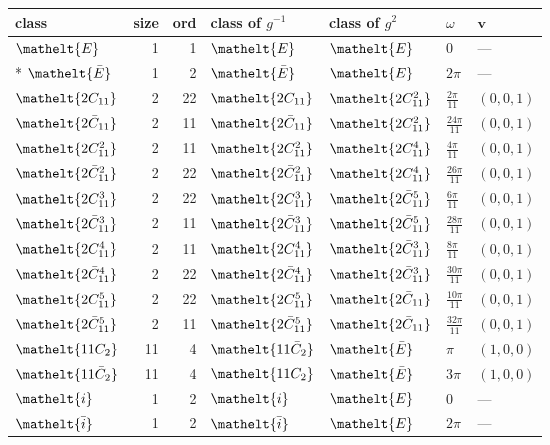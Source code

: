 \documentclass[10pt,a4paper]{article}
\numberwithin{equation}{section}
\newcommand{\eltfont}[1]{{\let\sigma\eltsigma\mathelt{#1}}}
\newcommand{\cls}[1]{\eltfont{#1}}
\newcommand{\dirvec}[3]{(#1, #2, #3)}
\newcommand{\vv}{\mathbf{v}}
\newcommand{\barred}[1]{\bar{#1}}
\begin{document}
{\renewcommand{\arraystretch}{1.3}\begin{longtable}{@{}lrrllll@{}}\toprule
class & size & ord & class of $g^{-1}$ & class of $g^{2}$ & $\omega$ & $\vv$\\\midrule\endhead
\bottomrule\endfoot\endlastfoot
$\cls{E}$ & 1 & 1 & $\cls{E}$ & $\cls{E}$ & $0$ & ---\\*
$\cls{\barred{E}}$ & 1 & 2 & $\cls{\barred{E}}$ & $\cls{E}$ & $2\pi$ & ---\\
$\cls{2C_{11}}$ & 2 & 22 & $\cls{2C_{11}}$ & $\cls{2C_{11}^{2}}$ & $\tfrac{2\pi}{11}$ & $\dirvec{0}{0}{1}$\\
$\cls{2\barred{C}_{11}}$ & 2 & 11 & $\cls{2\barred{C}_{11}}$ & $\cls{2C_{11}^{2}}$ & $\tfrac{24\pi}{11}$ & $\dirvec{0}{0}{1}$\\
$\cls{2C_{11}^{2}}$ & 2 & 11 & $\cls{2C_{11}^{2}}$ & $\cls{2C_{11}^{4}}$ & $\tfrac{4\pi}{11}$ & $\dirvec{0}{0}{1}$\\
$\cls{2\barred{C}_{11}^{2}}$ & 2 & 22 & $\cls{2\barred{C}_{11}^{2}}$ & $\cls{2C_{11}^{4}}$ & $\tfrac{26\pi}{11}$ & $\dirvec{0}{0}{1}$\\
$\cls{2C_{11}^{3}}$ & 2 & 22 & $\cls{2C_{11}^{3}}$ & $\cls{2\barred{C}_{11}^{5}}$ & $\tfrac{6\pi}{11}$ & $\dirvec{0}{0}{1}$\\
$\cls{2\barred{C}_{11}^{3}}$ & 2 & 11 & $\cls{2\barred{C}_{11}^{3}}$ & $\cls{2\barred{C}_{11}^{5}}$ & $\tfrac{28\pi}{11}$ & $\dirvec{0}{0}{1}$\\
$\cls{2C_{11}^{4}}$ & 2 & 11 & $\cls{2C_{11}^{4}}$ & $\cls{2\barred{C}_{11}^{3}}$ & $\tfrac{8\pi}{11}$ & $\dirvec{0}{0}{1}$\\
$\cls{2\barred{C}_{11}^{4}}$ & 2 & 22 & $\cls{2\barred{C}_{11}^{4}}$ & $\cls{2\barred{C}_{11}^{3}}$ & $\tfrac{30\pi}{11}$ & $\dirvec{0}{0}{1}$\\
$\cls{2C_{11}^{5}}$ & 2 & 22 & $\cls{2C_{11}^{5}}$ & $\cls{2\barred{C}_{11}}$ & $\tfrac{10\pi}{11}$ & $\dirvec{0}{0}{1}$\\
$\cls{2\barred{C}_{11}^{5}}$ & 2 & 11 & $\cls{2\barred{C}_{11}^{5}}$ & $\cls{2\barred{C}_{11}}$ & $\tfrac{32\pi}{11}$ & $\dirvec{0}{0}{1}$\\
$\cls{11C_{2}}$ & 11 & 4 & $\cls{11\barred{C}_{2}}$ & $\cls{\barred{E}}$ & $\pi$ & $\dirvec{1}{0}{0}$\\
$\cls{11\barred{C}_{2}}$ & 11 & 4 & $\cls{11C_{2}}$ & $\cls{\barred{E}}$ & $3\pi$ & $\dirvec{1}{0}{0}$\\
$\cls{i}$ & 1 & 2 & $\cls{i}$ & $\cls{E}$ & $0$ & ---\\
$\cls{\barred{i}}$ & 1 & 2 & $\cls{\barred{i}}$ & $\cls{E}$ & $2\pi$ & ---\\

\end{longtable}}
\end{document}

